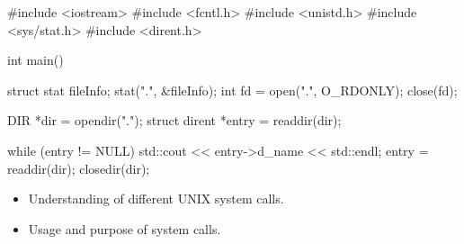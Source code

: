 \outputlabel
{}


\codelabel

\begin{code}
#include <iostream>
#include <fcntl.h>
#include <unistd.h>
#include <sys/stat.h>
#include <dirent.h>

int main() {
    struct stat fileInfo;
    stat(".", &fileInfo);
    int fd = open(".", O_RDONLY);
    close(fd);

    DIR *dir = opendir(".");
    struct dirent *entry = readdir(dir);

    while (entry != NULL) {
        std::cout << entry->d_name << std::endl;
        entry = readdir(dir);
    }
    closedir(dir);
}
\end{code}

\outputlabel
{}

\begin{itemize}
\item{Understanding of different UNIX system calls.}
\item{Usage and purpose of system calls.}
\end{itemize}


